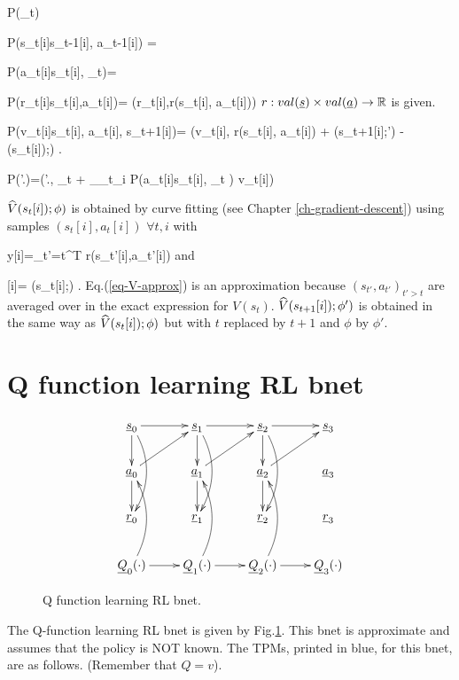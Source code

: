 \beq\color{blue}
P(\theta_t) 
\eeq

\beq\color{blue}
P(s_t[i]\mid s_{t-1}[i], a_{t-1}[i]) = 
\eeq

\beq\color{blue}
P(a_t[i]\mid s_t[i], \theta_t)= 
\eeq

\beq\color{blue}
P(r_t[i]\mid s_t[i],a_t[i])=
\delta(r_t[i],r(s_t[i], a_t[i]))
\eeq
$r:val(\rvs)\times val(\rva)\rarrow\RR $ is given.

\beq\color{blue}
P(\Delta v_t[i]\mid s_t[i], a_t[i], s_{t+1}[i])=
\delta(\Delta v_t[i], r(s_t[i], a_t[i]) +
\gamma {}(s_{t+1}[i];\phi')
- (s_t[i]);\phi)
\;.
\eeq

\beq\color{blue}
P(\theta'.)=\delta(\theta'.,
\theta_t +
\alpha \partial_{\theta_t}\sum_i
\ln P(a_t[i]\mid s_t[i], \theta_t )
\Delta v_t[i])
\eeq

${\widehat{V}}(s_t[i]);\phi)$ is
obtained by curve fitting
 (see Chapter \ref{ch-gradient-descent})
using samples $(s_t[i], a_t[i])$ 
$\forall t,i$
with

\beq
 y[i]=\sum_{t'=t}^{T}
r(s_{t'}[i],a_{t'}[i])
\label{eq-V-approx}
\eeq
and 

\beq
{}[i]=
(s_t[i];\phi)
\;.
\eeq
Eq.(\ref{eq-V-approx}) 
is an approximation
because $(s_{t'}, a_{t'})_{t'>t}$ 
are averaged over in the exact
expression for $V(s_t)$.
${\widehat{V}}(s_{t+1}[i]);\phi')$ is
obtained in the same way as
${\widehat{V}}(s_t[i]);\phi)$
but with $t$ replaced by $t+1$
and $\phi$ by $\phi'$.

\section{Q function learning RL bnet}

\begin{figure}
\centering
$$\xymatrix{
\rvs_0\ar[r]\ar[d]
\ar@/^1pc/[dd]&
\rvs_1\ar[r]\ar[d]
\ar@/^1pc/[dd]&
\rvs_2\ar[r]\ar[d]
\ar@/^1pc/[dd]&
\rvs_3\\
\rva_0\ar[d]\ar[ur]&
\rva_1\ar[d]\ar[ur]&
\rva_2\ar[d]\ar[ur]&
\rva_3\\
\rvr_0&
\rvr_1&
\rvr_2&
\rvr_3\\
\rvQ_0(\cdot)\ar@/_1pc/[uu]\ar[r]&
\rvQ_1(\cdot)\ar@/_1pc/[uu]\ar[r]&
\rvQ_2(\cdot)\ar@/_1pc/[uu]\ar[r]&
\rvQ_3(\cdot)
}$$
\caption{Q function learning  RL bnet. }
\label{fig-learn-q}
\end{figure}
The Q-function learning RL bnet
is given by Fig.\ref{fig-learn-q}. This
bnet is approximate and assumes
that the policy is NOT known. The
TPMs, printed in blue, for this bnet,
are as follows. (Remember
that $Q=v$).

